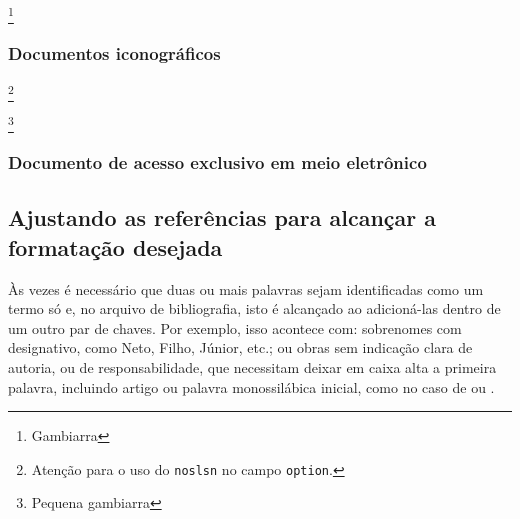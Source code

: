 
\footnote{Gambiarra}


\subsubsection{Documentos iconográficos}
\footnote{Atenção para o uso do \texttt{noslsn} no campo \texttt{option}.}


\footnote{Pequena gambiarra}

\subsubsection{Documento de acesso exclusivo em meio eletrônico}



\subsection{Ajustando as referências para alcançar a formatação desejada}







Às vezes é necessário que duas ou mais palavras sejam identificadas como um termo só e, no arquivo de bibliografia, isto é alcançado ao adicioná-las dentro de um outro par de chaves. Por exemplo, isso acontece com: sobrenomes com designativo, como Neto, Filho, Júnior, etc.; ou obras sem indicação clara de autoria, ou de responsabilidade, que necessitam deixar em caixa alta a primeira palavra, incluindo artigo ou palavra monossilábica inicial, como no caso de  ou .

